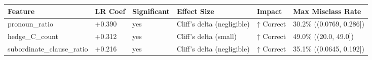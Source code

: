 \begin{tabular}{llllll}
\toprule
Feature & LR Coef & Significant & Effect Size & Impact & Max Misclass Rate \\
\midrule
pronoun\_ratio & +0.390 & yes & Cliff's delta (negligible) & ↑ Correct & 30.2\% ((0.0769, 0.286]) \\
hedge\_C\_count & +0.312 & yes & Cliff's delta (small) & ↑ Correct & 49.0\% ((20.0, 49.0]) \\
subordinate\_clause\_ratio & +0.216 & yes & Cliff's delta (negligible) & ↑ Correct & 35.1\% ((0.0645, 0.192]) \\
\bottomrule
\end{tabular}
